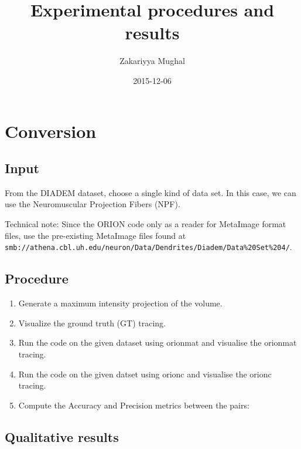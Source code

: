 \documentclass[12pt]{article}
\title{Experimental procedures and results}
\author{Zakariyya Mughal}
\date{2015-12-06}
\begin{document}
\singlespacing

\maketitle
\tableofcontents

\section{Conversion}

\subsection{Input}

From the DIADEM dataset, choose a single kind of data set. In this case, we can
use the Neuromuscular Projection Fibers (NPF).

Technical note: Since the ORION code only as a reader for MetaImage format
files, use the pre-existing MetaImage files found at
\nolinkurl{smb://athena.cbl.uh.edu/neuron/Data/Dendrites/Diadem/Data\%20Set\%204/}.

\subsection{Procedure}

\begin{enumerate}
	\item Generate a maximum intensity projection of the
		volume.
	\item Visualize the ground truth (GT) tracing.
	\item Run the code on the given dataset using
		\gls{orionmat}
		and visualise the \gls{orionmat} tracing.
	\item Run the code on the given datset using
		\gls{orionc}
		and visualise the \gls{orionc} tracing.
	\item Compute the Accuracy and Precision metrics between the pairs:
\end{enumerate}

\subsection{Qualitative results}
\end{document}
